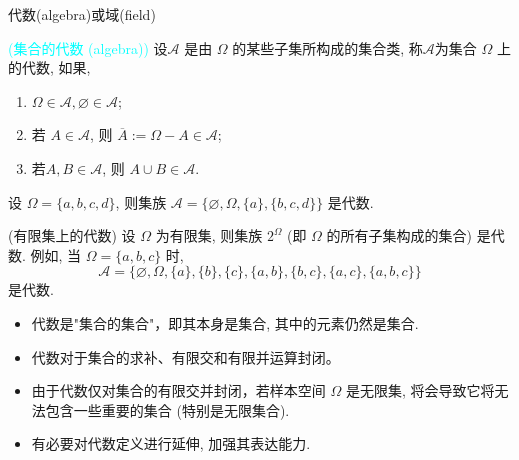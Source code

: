\begin{frame}{代数(algebra)或域(field)}
\begin{defi}\textcolor{cyan}{(集合的代数 (algebra))}  设${\mathcal{A}}$ 是由 ${\Omega}$ 的某些子集所构成的集合类, 称${\mathcal{A}}$为集合 ${\Omega}$ 上的代数, 如果,
	\begin{enumerate}[<+-|alert@+>]
		\item ${\Omega \in \mathcal{A}, \varnothing \in \mathcal{A}}$;
		\item 若 ${A \in \mathcal{A}}$, 则 $\overline{A}:=\Omega-A\in \mathcal{A}$;
		\item 若${A, B \in \mathcal{A}}$, 则 $A \cup B \in \mathcal{A}.$
	\end{enumerate}
\end{defi}

\pause

\begin{exam}
	设 ${\Omega=\{a, b, c, d\}}$, 则集族 ${\mathcal{A}=\{\varnothing, \Omega,\{a\},\{b, c, d\}\}}$ 是代数.
\end{exam}

\pause
\begin{exam}
	(有限集上的代数) 设 ${\Omega}$ 为有限集, 则集族 ${2^{\Omega}}$ (即 ${\Omega}$ 的所有子集构成的集合) 是代数. 例如, 当 ${\Omega=\{a, b, c\}}$ 时,
	\[
	\mathcal{A}=\{\varnothing, \Omega,\{a\},\{b\},\{c\},\{a, b\},\{b, c\},\{a, c\},\{a, b, c\}\}
	\]
	是代数.
\end{exam}

\pause
\begin{rmk}
	\begin{itemize}[<+-|alert@+>]
		\item 代数是"集合的集合"，即其本身是集合, 其中的元素仍然是集合. %
		\item 代数对于集合的求补、有限交和有限并运算封闭。
		\item 由于代数仅对集合的有限交并封闭，若样本空间 ${\Omega}$ 是无限集, 将会导致它将无法包含一些重要的集合 (特别是无限集合).
		\item 有必要对代数定义进行延伸, 加强其表达能力.
	\end{itemize}


\end{rmk}




\end{frame}






